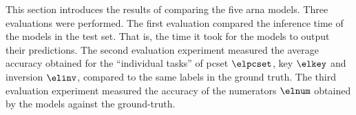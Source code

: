
This section introduces the results of comparing the five
\gls{arna} models. Three evaluations were performed. The
first evaluation compared the inference time of the models
in the test set. That is, the time it took for the models to
output their predictions. The second evaluation experiment
measured the average accuracy obtained for the ``individual
tasks'' of \gls{pcset} $\elpcset$, key $\elkey$ and
inversion $\elinv$, compared to the same labels in the
ground truth. The third evaluation experiment measured the
accuracy of the numerators $\elnum$ obtained by the models
against the ground-truth. 

